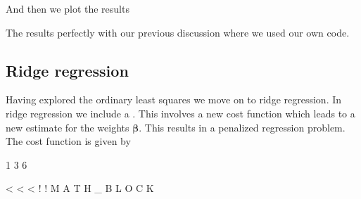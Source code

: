 \documentclass[letterpaper,10pt,english]{sphinxmanual}
\begin{document}
\begin{sphinxVerbatim}[commandchars=\\\{\}]
   
\end{sphinxVerbatim}

And then we plot the results

\begin{sphinxVerbatim}[commandchars=\\\{\}]
   
   
 
  
 
\end{sphinxVerbatim}

The results perfectly with our previous discussion where we used our own code.


\subsection{Ridge regression}
\label{\detokenize{chapter4:ridge-regression}}
Having explored the ordinary least squares we move on to ridge
regression. In ridge regression we include a . This
involves a new cost function which leads to a new estimate for the
weights \(\boldsymbol{\beta}\). This results in a penalized regression problem. The
cost function is given by

1
3
6

\textless{}
\textless{}
\textless{}
!
!
M
A
T
H
\_
B
L
O
C
K
\end{document}
